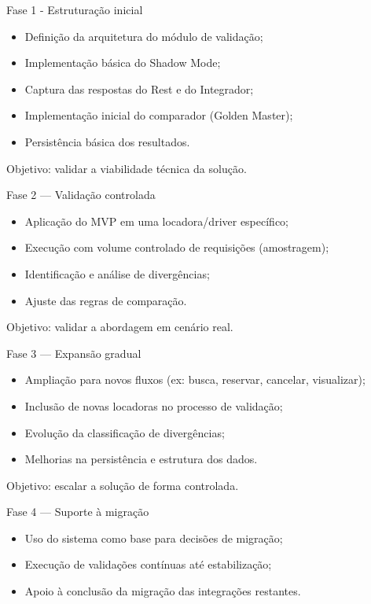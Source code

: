 \vspace{0.5em}
Fase 1 - Estruturação inicial
\begin{itemize}
    \item Definição da arquitetura do módulo de validação;
    \item Implementação básica do Shadow Mode;
    \item Captura das respostas do Rest e do Integrador;
    \item Implementação inicial do comparador (Golden Master);
    \item Persistência básica dos resultados.
\end{itemize}

Objetivo: validar a viabilidade técnica da solução.

\vspace{0.5em}
Fase 2 — Validação controlada
\begin{itemize}
    \item Aplicação do MVP em uma locadora/driver específico;
    \item Execução com volume controlado de requisições (amostragem);
    \item Identificação e análise de divergências;
    \item Ajuste das regras de comparação.
\end{itemize}

Objetivo: validar a abordagem em cenário real.

\vspace{0.5em}
Fase 3 — Expansão gradual
\begin{itemize}
    \item Ampliação para novos fluxos (ex: busca, reservar, cancelar, visualizar);
    \item Inclusão de novas locadoras no processo de validação;
    \item Evolução da classificação de divergências;
    \item Melhorias na persistência e estrutura dos dados.
\end{itemize}

Objetivo: escalar a solução de forma controlada.

\vspace{0.5em}
Fase 4 — Suporte à migração
\begin{itemize}
    \item Uso do sistema como base para decisões de migração;
    \item Execução de validações contínuas até estabilização;
    \item Apoio à conclusão da migração das integrações restantes.
\end{itemize}

